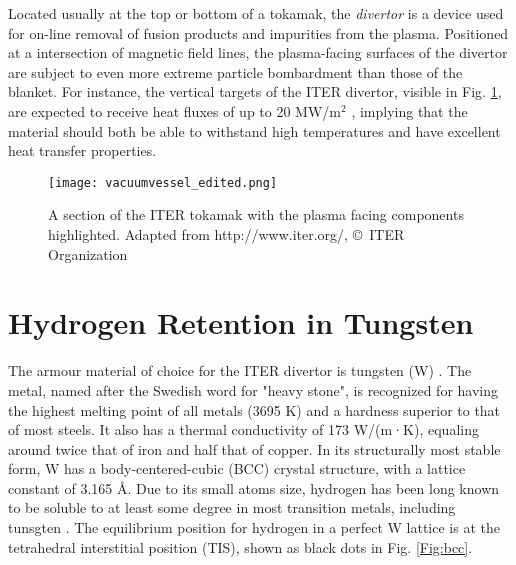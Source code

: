Located usually at the top or bottom of a tokamak, the \textit{divertor} is a device used for on-line removal of fusion products and impurities from the plasma.
Positioned at a intersection of magnetic field lines, the plasma-facing surfaces of the divertor are subject to even more extreme particle bombardment than those of the blanket.
For instance, the vertical targets of the ITER divertor, visible in Fig. \ref{fig:ITERslice}, are expected to receive heat fluxes of up to 20 MW/m$^2$ \cite{Iter1234Divertor}, implying that the material should both be able to withstand high temperatures and have excellent heat transfer properties.

\begin{figure}[!ht]
\center
\texttt{[image: vacuumvessel\_edited.png]}
\caption{A section of the ITER tokamak with the plasma facing components highlighted. Adapted from http://www.iter.org/, \copyright~ITER Organization}
\label{fig:ITERslice}
\end{figure}

\section{Hydrogen Retention in Tungsten}
The armour material of choice for the ITER divertor is tungsten (W) \cite{PITTS2013S48}.
The metal, named after the Swedish word for "heavy stone", is recognized for having the highest melting point of all metals (3695 K) and a hardness superior to that of most steels. 
It also has a thermal conductivity of 173 W/(m·K), equaling around twice that of iron and half that of copper. 
In its structurally most stable form, W has a body-centered-cubic (BCC) crystal structure, with a lattice constant of 3.165 \AA.
Due to its small atoms size, hydrogen has been long known to be soluble to at least some degree in most transition metals, including tunsgten \cite{smith1934occlusion, frauenfelder1969solution}.
The equilibrium position for hydrogen in a perfect W lattice is at the tetrahedral interstitial position (TIS), shown as black dots in Fig. \ref{Fig:bcc}. 

